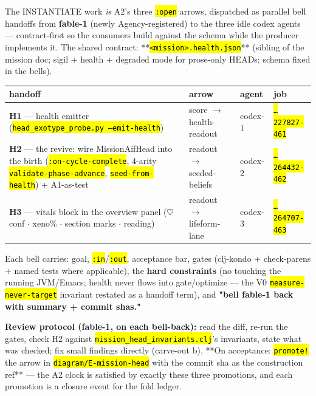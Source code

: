 \documentclass[11pt,oneside]{article}
\newcommand{\scopehl}[1]{\texttt{\hl{#1}}}
\begin{document}
\begin{phasebox}[title={6. INSTANTIATE (opened 2026-06-10) --- three arrows, three bells}]

The INSTANTIATE work \emph{is} A2's three \scopehl{:open} arrows, dispatched as parallel
bell handoffs from \textbf{fable-1} (newly Agency-registered) to the three idle
codex agents --- contract-first so the consumers build against the schema while
the producer implements it. The shared contract: **\scopehl{<mission>.health.json}**
(sibling of the mission doc; sigil + health + degraded mode for prose-only
HEADs; schema fixed in the bells).

\begin{center}\small\begin{tabular}{llll}
\toprule
handoff & arrow & agent & job \\
\midrule
\textbf{H1} --- health emitter (\scopehl{head\_exotype\_probe.py --emit-health}) & score $\rightarrow$ health-readout & codex-1 & \scopehl{\ldots{}227827-461} \\
\textbf{H2} --- the revive: wire MissionAifHead into the birth (\scopehl{:on-cycle-complete}, 4-arity \scopehl{validate-phase-advance}, \scopehl{seed-from-health}) + A1-as-test & readout $\rightarrow$ seeded-beliefs & codex-2 & \scopehl{\ldots{}264432-462} \\
\textbf{H3} --- vitals block in the overview panel ($\heartsuit$ conf $\cdot$ xeno\% $\cdot$ section marks $\cdot$ reading) & readout $\rightarrow$ lifeform-lane & codex-3 & \scopehl{\ldots{}264707-463} \\
\bottomrule
\end{tabular}\end{center}

Each bell carries: goal, \scopehl{:in}/\scopehl{:out}, acceptance bar, gates (clj-kondo +
check-parens + named tests where applicable), the \textbf{hard constraints} (no
touching the running JVM/Emacs; health never flows into gate/optimize --- the
V0 \scopehl{measure-never-target} invariant restated as a handoff term), and
\textbf{"bell fable-1 back with summary + commit shas."}

\textbf{Review protocol (fable-1, on each bell-back):} read the diff, re-run the
gates, check H2 against \scopehl{mission\_head\_invariants.clj}'s invariants, state what
was checked; fix small findings directly (carve-out b). **On acceptance:
\scopehl{promote!} the arrow in \scopehl{diagram/E-mission-head} with the commit sha as the
construction ref** --- the A2 clock is satisfied by exactly these three
promotions, and each promotion is a closure event for the fold ledger.

\end{phasebox}
\end{document}

